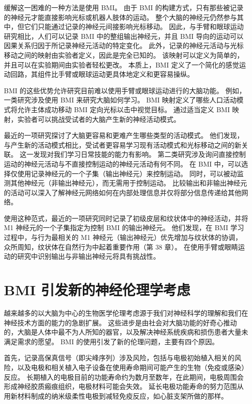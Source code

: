 缓解这一困难的一种方法是使用 BMI。 由于 BMI 的构建方式，只有那些被记录的神经元才能直接影响光标或机器人肢体的运动。 整个大脑的神经元仍然参与其中，但它们只能通过记录的神经元间接影响光标移动。 因此，与手臂和眼球运动研究相比，人们可以记录 BMI 中的整组输出神经元，并且 BMI 导向的运动可以因果关系归因于所记录神经元活动的特定变化。 此外，记录的神经元活动与光标移动之间的映射由实验者定义，因此是完全已知的。 该映射可以定义为简单的，并且可以在实验期间由实验者轻松更改。 本质上，BMI 定义了一个简化的感觉运动回路，其组件比手臂或眼球运动更具体地定义和更容易操纵。

BMI 的这些优势允许研究目前难以使用手臂或眼球运动进行的大脑功能。 例如，一类研究涉及使用 BMI 来研究大脑如何学习。 BMI 映射定义了哪些人口活动模式将允许主体成功移动 BMI 定向光标以击中视觉目标。 通过适当定义 BMI 映射，实验者可以挑战受试者的大脑产生新的神经活动模式。

最近的一项研究探讨了大脑更容易和更难产生哪些类型的活动模式。 他们发现，与产生新的活动模式相比，受试者更容易学习现有活动模式和光标移动之间的新关联。 这一发现对我们学习日常技能的能力有影响。 第二类研究涉及询问直接控制运动的神经元活动与不直接控制运动的神经元活动有何不同。 在 BMI 中，可以选择仅使用记录神经元的一个子集（输出神经元）来控制运动。 同时，可以被动监测其他神经元（非输出神经元），而无需用于控制运动。 比较输出和非输出神经元的活动可以深入了解神经元网络如何在内部处理信息并仅将部分信息传递给其他网络。

使用这种范式，最近的一项研究同时记录了初级皮层和纹状体中的神经活动，并将 M1 神经元的一个子集指定为控制 BMI 的输出神经元。 他们发现，在 BMI 学习过程中，与行为最相关的 M1 神经元（输出神经元）优先增加与纹状体的协调，众所周知，纹状体在自然行为中起着重要作用（第 38 章）。 在使用手臂或眼睛运动的研究中识别输出与非输出神经元将具有挑战性。

\section{BMI 引发新的神经伦理学考虑}

越来越多的以大脑为中心的生物医学伦理考虑源于我们对神经科学的理解和我们在神经技术方面的能力的急剧扩展。 这些进步是由社会对大脑功能的好奇心推动的，大脑是人体中最不为人所知的器官，以及解决神经系统疾病和损伤患者大量未满足需求的愿望。 BMI 的使用引发了新的伦理问题，主要有四个原因。

首先，记录高保真信号（即尖峰序列）涉及风险，包括与电极初始植入相关的风险，以及电极和相关植入电子设备在使用寿命期间可能产生的生物（免疫或感染）反应。 长期植入的电极目前的功能寿命约为数月至数年，在此期间，电极周围会形成神经胶质瘢痕组织，电极材料可能会失效。 延长电极功能寿命的努力范围从用新材料制成的纳米级柔性电极到减轻免疫反应，如心脏支架所做的那样。

